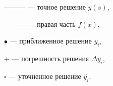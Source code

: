 \begin{exam}
\begin{center}


--------- \quad --- точное решение $y(s)$,\quad


-- -- -- -- \quad --- правая часть $f(x)$,





$\bullet$ --- приближенное решение $y_i$,


$+$ --- погрешность решения $\Delta y_i$,


$\square$ --- уточненное решение $\widehat y_i$.


\end{center}


\end{exam}





